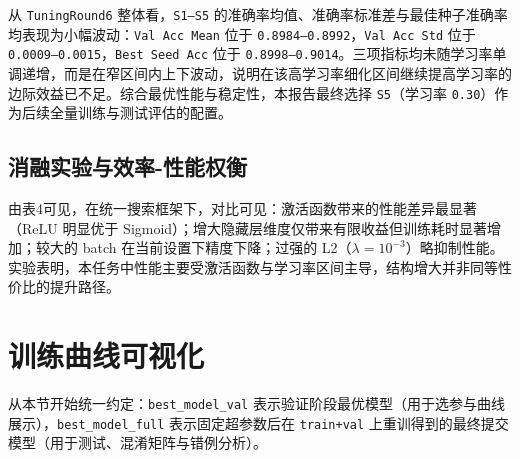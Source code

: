 \documentclass[11pt]{article}
\begin{document}
\begin{CJK*}{UTF8}{gbsn}
从 \texttt{TuningRound6} 整体看，\texttt{S1--S5} 的准确率均值、准确率标准差与最佳种子准确率均表现为小幅波动：\texttt{Val Acc Mean} 位于 \texttt{0.8984--0.8992}，\texttt{Val Acc Std} 位于 \texttt{0.0009--0.0015}，\texttt{Best Seed Acc} 位于 \texttt{0.8998--0.9014}。三项指标均未随学习率单调递增，而是在窄区间内上下波动，说明在该高学习率细化区间继续提高学习率的边际效益已不足。综合最优性能与稳定性，本报告最终选择 \texttt{S5}（学习率 \texttt{0.30}）作为后续全量训练与测试评估的配置。
\FloatBarrier
{}
\subsection{消融实验与效率-性能权衡}
\begin{table}[H]
\centering
\small
\setlength{\tabcolsep}{4pt}
\normalsize
\caption{基于第 1 轮调参（\texttt{TuningRound1}）搜索日志的消融与效率对比。其中，\texttt{A0} 为基线设置（激活函数为 ReLU、隐藏层维度为 256、批大小为 64、L2 正则化系数为 $10^{-4}$）；\texttt{A1} 仅将激活函数改为 Sigmoid；\texttt{A2} 仅将隐藏层维度改为 128；\texttt{A3} 仅将批大小改为 128；\texttt{A4} 仅将 L2 正则化系数改为 $10^{-3}$。}
\label{tab:ablation-round1}
\end{table}

由表4可见，在统一搜索框架下，对比可见：激活函数带来的性能差异最显著（ReLU 明显优于 Sigmoid）；增大隐藏层维度仅带来有限收益但训练耗时显著增加；较大的 batch 在当前设置下精度下降；过强的 L2（$\lambda=10^{-3}$）略抑制性能。实验表明，本任务中性能主要受激活函数与学习率区间主导，结构增大并非同等性价比的提升路径。

\FloatBarrier
{}
\section{训练曲线可视化}

从本节开始统一约定：\texttt{best\_model\_val} 表示验证阶段最优模型（用于选参与曲线展示），\texttt{best\_model\_full} 表示固定超参数后在 \texttt{train+val} 上重训得到的最终提交模型（用于测试、混淆矩阵与错例分析）。


\end{CJK*}
\end{document}
